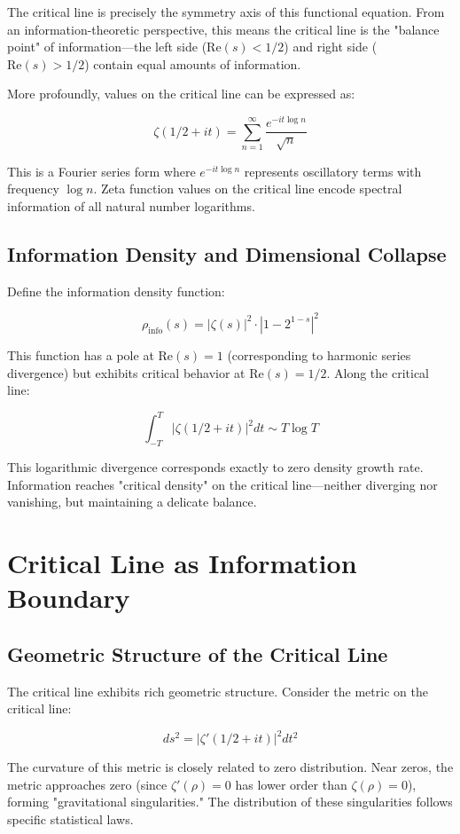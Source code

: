 \documentclass[12pt]{article}
\begin{document}
The critical line is precisely the symmetry axis of this functional equation. From an information-theoretic perspective, this means the critical line is the "balance point" of information—the left side ($\text{Re}(s) < 1/2$) and right side ($\text{Re}(s) > 1/2$) contain equal amounts of information.

More profoundly, values on the critical line can be expressed as:

$$\zeta(1/2 + it) = \sum_{n=1}^{\infty} \frac{e^{-it\log n}}{\sqrt{n}}$$

This is a Fourier series form where $e^{-it\log n}$ represents oscillatory terms with frequency $\log n$. Zeta function values on the critical line encode spectral information of all natural number logarithms.

\subsection{Information Density and Dimensional Collapse}

Define the information density function:

$$\rho_{\text{info}}(s) = |\zeta(s)|^2 \cdot |1 - 2^{1-s}|^2$$

This function has a pole at $\text{Re}(s) = 1$ (corresponding to harmonic series divergence) but exhibits critical behavior at $\text{Re}(s) = 1/2$. Along the critical line:

$$\int_{-T}^{T} |\zeta(1/2 + it)|^2 dt \sim T\log T$$

This logarithmic divergence corresponds exactly to zero density growth rate. Information reaches "critical density" on the critical line—neither diverging nor vanishing, but maintaining a delicate balance.

\section{Critical Line as Information Boundary}

\subsection{Geometric Structure of the Critical Line}

The critical line exhibits rich geometric structure. Consider the metric on the critical line:

$$ds^2 = |\zeta'(1/2 + it)|^2 dt^2$$

The curvature of this metric is closely related to zero distribution. Near zeros, the metric approaches zero (since $\zeta'(\rho) = 0$ has lower order than $\zeta(\rho) = 0$), forming "gravitational singularities." The distribution of these singularities follows specific statistical laws.
\end{document}
